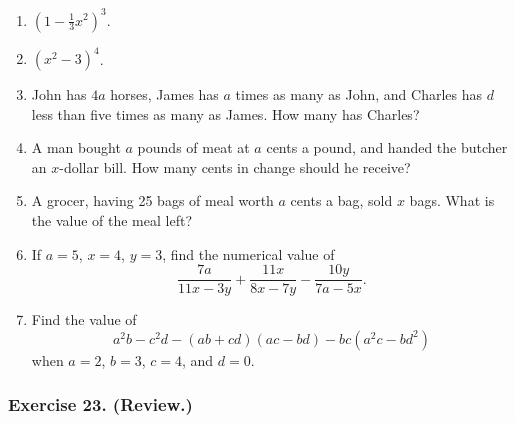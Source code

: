 \documentclass{book}
\begin{document}
\begin{enumerate}
\item $(1-\frac{1}{3}x^2)^3$.

\item $(x^2-3)^4$.

\item John has $4a$ horses, James has $a$ times as many as John,
and Charles has $d$ less than five times as many as James. How
many has Charles?

\item A man bought $a$ pounds of meat at $a$ cents a pound, and
handed the butcher an $x$-dollar bill. How many cents in change
should he receive?

\item A grocer, having 25 bags of meal worth $a$ cents a bag, sold
$x$ bags. What is the value of the meal left?

 \item If $a = 5$, $x
= 4$, $y = 3$, find the numerical value of
\[
\frac{7a}{11x-3y} + \frac{11x}{8x-7y} - \frac{10y}{7a-5x}.
\]

\item Find the value of
\[
a^2b - c^2d - (ab+cd)(ac-bd) - bc(a^2c-bd^2)
\]
when $a = 2$, $b = 3$, $c = 4$, and $d = 0$.
\end{enumerate}

\subsubsection*{Exercise 23. (Review.)}
\end{document}
